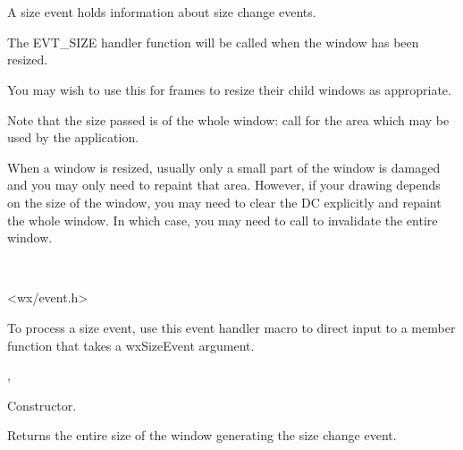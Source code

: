 
\section{}\label{wxsizeevent}

A size event holds information about size change events.

The EVT\_SIZE handler function will be called when the window has been resized.

You may wish to use this for frames to resize their child windows as appropriate.

Note that the size passed is of
the whole window: call  for the area which may be
used by the application.

When a window is resized, usually only a small part of the window is damaged and you
may only need to repaint that area. However, if your drawing depends on the size of the window,
you may need to clear the DC explicitly and repaint the whole window. In which case, you
may need to call  to invalidate the entire window.


\\


<wx/event.h>


To process a size event, use this event handler macro to direct input to a member
function that takes a wxSizeEvent argument.

\twocolwidtha{7cm}
\begin{twocollist}\itemsep=0pt
\end{twocollist}%


,\rtfsp
{}


\label{wxsizeeventctor}


Constructor.

\label{wxsizeeventgetsize}


Returns the entire size of the window generating the size change event.

